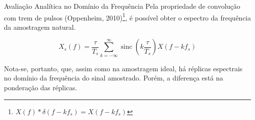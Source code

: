 \documentclass{beamer}
\begin{document}
\begin{frame}{Avaliação Analítica no Domínio da Frequência}
    Pela propriedade de convolução com trem de pulsos (Oppenheim, 2010)\footnote{$X(f)*\delta(f-kf_s)=X(f-kf_s)$}, é possível obter o espectro da frequência da amostragem natural.

    \begin{equation}
        X_s(f)=\frac{\tau}{T_s}\sum_{k=-\infty}^{\infty}\operatorname{sinc}\left(k\frac{\tau}{T_s}\right)X(f-kf_s)
    \end{equation}

    Nota-se, portanto, que, assim como na amostragem ideal, há réplicas espectrais no domínio da frequência do sinal amostrado. Porém, a diferença está na ponderação das réplicas.
\end{frame}
\end{document}
